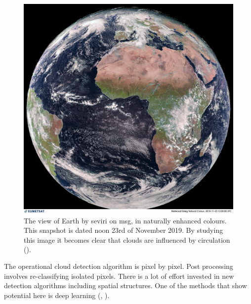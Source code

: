 \begin{figure}[h]
    \centering
    \includegraphics[scale=0.11]{Chapter2_Theory/images/MET10_RGBNatColourEnhncd_FullResolution_20191123120000.jpg}    
    \caption{The view of Earth by \acrshort{seviri} on \acrshort{msg}, in naturally enhanced colours. This snapshot is dated noon 23rd of November 2019. By studying this image it becomes clear that clouds are influenced by circulation  (\cite{eumetcast_image_gallery}).}
    \label{fig:sat_view}
\end{figure}
The operational cloud detection algorithm is pixel by pixel. Post processing involves re-classifying isolated pixels. There is a lot of effort invested in new detection algorithms including spatial structures. One of the methods that show potential here is deep learning (\cite{Dronner2018FastNetworks}, \cite{jeppesen_deep_cloud_masking}).


